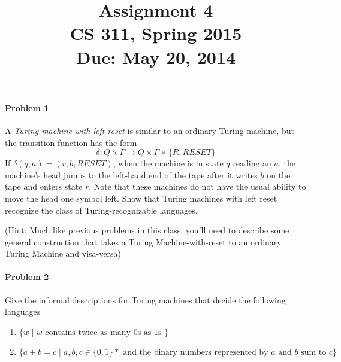 \documentclass{article}
\title{\vspace{-3ex} \bf Assignment 4 \\[1ex]\rm\normalsize CS 311, Spring 2015 \\ Due: May 20, 2014}
\date{}
\author{}
\begin{document}
\maketitle
\paragraph{Problem 1}
 A {\em Turing machine with left reset} is similar to an ordinary Turing machine, but the 
 transition function has the form
  \begin{displaymath}
    \delta : Q \times \Gamma \to Q \times \Gamma \times \{R,RESET\}
  \end{displaymath}
If $\delta (q,a) = (r,b,RESET)$, when the machine is in state $q$ reading an $a$, the machine's 
head jumps to the left-hand end of the tape after it writes $b$ on the tape and enters state 
$r$. Note that these machines do not have the usual ability to move the head one symbol left. 
Show that Turing machines with left reset recognize the class of Turing-recognizable languages.

  (Hint: Much like previous problems in this class, you'll need to describe some general 
  construction that takes a Turing Machine-with-reset to an ordinary Turing Machine and visa-versa)

\paragraph{Problem 2}
Give the informal descriptions for Turing machines that decide the following languages
\begin{enumerate}[\indent a)]
    \item $\{w \;|\; w \text{ contains twice as many 0s as 1s }\}$
    \item $\{a+b=c \;|\; a,b,c \in \{0,1\}* \text{ and the binary numbers represented by $a$ 
    and $b$ sum to $c$} \}$
\end{enumerate}
\end{document}
